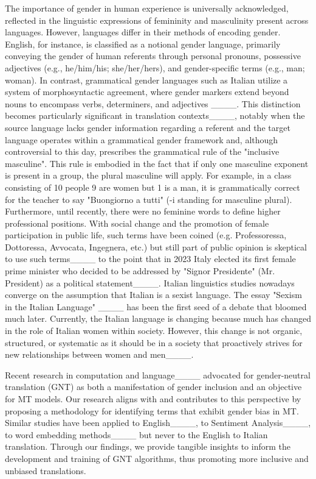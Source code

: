 The importance of gender in human experience is universally acknowledged, reflected in the linguistic expressions of femininity and masculinity present across languages. However, languages differ in their methods of encoding gender. English, for instance, is classified as a notional gender language, primarily conveying the gender of human referents through personal pronouns, possessive adjectives (e.g., he/him/his; she/her/hers), and gender-specific terms (e.g., man; woman). In contrast, grammatical gender languages such as Italian utilize a system of morphosyntactic agreement, where gender markers extend beyond nouns to encompass verbs, determiners, and adjectives ____. This distinction becomes particularly significant in translation contexts____, notably when the source language lacks gender information regarding a referent and the target language operates within a grammatical gender framework and, although controversial to this day, prescribes the grammatical rule of the "inclusive masculine". This rule is embodied in the fact that if only one masculine exponent is present in a group, the plural masculine will apply. For example, in a class consisting of 10 people 9 are women but 1 is a man, it is grammatically correct for the teacher to say "Buongiorno a tutti" (-i standing for masculine plural). Furthermore, until recently, there were no feminine words to define higher professional positions. With social change and the promotion of female participation in public life, such terms have been coined (e.g. Professoressa, Dottoressa, Avvocata, Ingegnera, etc.) but still part of public opinion is skeptical to use such terms____ to the point that in 2023 Italy elected its first female prime minister who decided to be addressed by "Signor Presidente" (Mr. President) as a political statement____. Italian linguistics studies nowadays converge on the assumption that Italian is a sexist language. The essay "Sexism in the Italian Language" ____  has been the first seed of a debate that bloomed much later. Currently, the Italian language is changing because much has changed in the role of Italian women within society. However, this change is not organic, structured, or systematic as it should be in a society that proactively strives for new relationships between women and men____. 

Recent research in computation and language____ advocated for gender-neutral translation (GNT) as both a manifestation of gender inclusion and an objective for MT models. Our research aligns with and contributes to this perspective by proposing a methodology for identifying terms that exhibit gender bias in MT. Similar studies have been applied to English____, to Sentiment Analysis____, to word embedding methods____ but never to the English to Italian translation. Through our findings, we provide tangible insights to inform the development and training of GNT algorithms, thus promoting more inclusive and unbiased translations.

